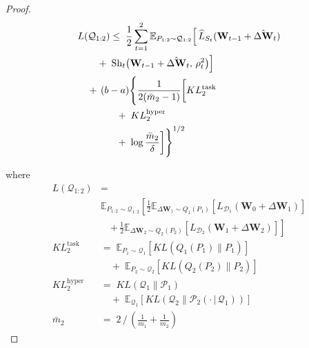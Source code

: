 \documentclass[letterpaper]{article} %
\begin{document}
\begin{proof}
\begin{align}
& L(\mathcal{Q}_{1:2}) \leq\;  \frac{1}{2} \sum_{t=1}^2 
    \mathbb{E}_{P_{1:2} \sim \mathcal{Q}_{1:2}} 
    \Big[\, 
        \widehat{L}_{S_t}(\mathbf{W}_{t-1} + \hat{\Delta\mathbf{W}}_t) \notag \\
&\qquad
    +\; \mathrm{Sh}_t\big(\mathbf{W}_{t-1} + \hat{\Delta\mathbf{W}}_t,\, \rho_t^2\big)
    \Big] \notag \\
&\quad
    +\, (b-a)\Bigg\{ \frac{1}{2(\bar{m}_2 - 1)} \bigg[
            KL^{\text{task}}_2 \notag \\
&\qquad\qquad
            +\; KL^{\text{hyper}}_2 \notag \\
&\qquad\qquad
            +\; \log\frac{\bar{m}_2}{\delta}
        \bigg] \Bigg\}^{1/2}
\end{align}



where 
\begin{align*}
L(\mathcal{Q}_{1:2}) &= \\
&\mathbb{E}_{P_{1:2} \sim \mathcal{Q}_{1:2}} 
\left[
    \frac{1}{2} \mathbb{E}_{\Delta\mathbf{W}_1 \sim Q_1(P_1)} 
    \left[
        L_{\mathcal{D}_1}(\mathbf{W}_0 + \Delta\mathbf{W}_1)
    \right] \right.\\
&\quad \left.
    +\, \frac{1}{2} \mathbb{E}_{\Delta\mathbf{W}_2 \sim Q_2(P_2)} 
    \left[
        L_{\mathcal{D}_2}(\mathbf{W}_1 + \Delta\mathbf{W}_2)
    \right]
\right] \\
KL^{\text{task}}_2 &=\; 
    \mathbb{E}_{P_1 \sim \mathcal{Q}_1}\left[ KL(Q_1(P_1)\|P_1) \right] \\
& \quad +\; \mathbb{E}_{P_2 \sim \mathcal{Q}_2}\left[ KL(Q_2(P_2)\|P_2) \right] \\[1.2ex]
KL^{\text{hyper}}_2 &=\; 
    KL(\mathcal{Q}_1\|\mathcal{P}_1) \\
& \quad +\; \mathbb{E}_{\mathcal{Q}_1}\left[ KL(\mathcal{Q}_2 \| \mathcal{P}_2(\cdot\,|\,\mathcal{Q}_1)) \right] \\
\bar{m}_2 &=\;  2\, /\, \left(\frac{1}{m_1} + \frac{1}{m_2}\right)
\end{align*}



\end{proof}
\end{document}
